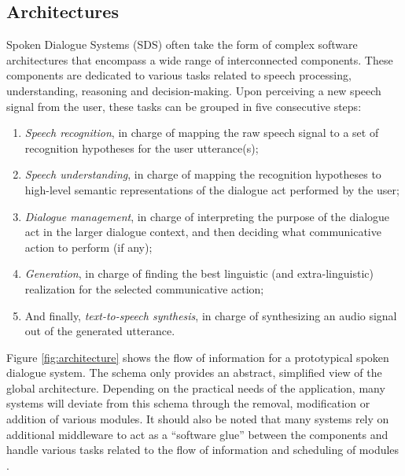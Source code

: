  \subsection{Architectures}

Spoken Dialogue Systems (SDS) often take the form of complex software architectures that encompass a wide range of interconnected components. These components are dedicated to various tasks related to speech processing, understanding, reasoning and decision-making. Upon perceiving a new speech signal from the user, these tasks can be grouped in five consecutive steps: 
\begin{enumerate}
\item \textit{Speech recognition}, in charge of mapping the raw speech signal to a set of recognition hypotheses for the user utterance(s);
\item \textit{Speech understanding}, in charge of mapping the recognition hypotheses to high-level semantic representations of the dialogue act performed by the user;
\item \textit{Dialogue management}, in charge of interpreting the purpose of the dialogue act in the larger dialogue context, and then deciding what communicative action to perform (if any);
\item \textit{Generation}, in charge of finding the best linguistic (and extra-linguistic) realization for the selected communicative action;
\item And finally, \textit{text-to-speech synthesis}, in charge of synthesizing an audio signal out of the generated utterance.
 \end{enumerate}
 
 Figure \ref{fig:architecture} shows the flow of information for a prototypical spoken dialogue system.  The schema only provides an abstract, simplified view of the global architecture.  Depending on the practical needs of the application, many systems will deviate from this schema through the removal, modification or addition of various modules.  It should also be noted that many systems rely on additional middleware to act as a ``software glue'' between the components and handle various tasks related to the flow of information and scheduling of modules \citep{jaspis2004,Herzog:2004,Bohus:2009,schlangen2010}.
   
